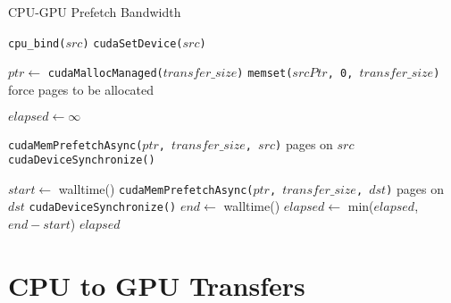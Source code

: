 \begin{algorithm}
	\caption{CPU-GPU Prefetch Bandwidth}
	\label{alg:um-prefetch-bw}
	\begin{algorithmic}[1]
		\Statex
				
		\State \texttt{cpu\_bind($src$)}
		\Else
		\State \texttt{cudaSetDevice($src$)}
		\EndIf
				
		\State $ptr \gets$ \texttt{cudaMallocManaged($transfer\_size$)}
		\State \texttt{memset($srcPtr$, 0, $transfer\_size$)} \Comment force pages to be allocated
				
		\State $elapsed \gets \infty$
				
		\State \texttt{cudaMemPrefetchAsync($ptr$, $transfer\_size$, $src$)} \Comment pages on $src$
		\State \texttt{cudaDeviceSynchronize()}
				
		\State $start \gets$ walltime()
		\State \texttt{cudaMemPrefetchAsync($ptr$, $transfer\_size$, $dst$)} \Comment pages on $dst$
		\State \texttt{cudaDeviceSynchronize()}
		\State $end \gets$ walltime()
		\State $elapsed \gets$ min($elapsed$, $end-start$)
		\EndFor
		\State \Return $elapsed$
		\EndFunction
				
	\end{algorithmic}
\end{algorithm}

\section{CPU to GPU Transfers}
\label{sec:um-cpu-gpu}


